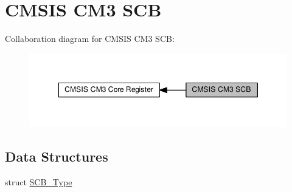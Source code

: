 \hypertarget{group__CMSIS__CM3__SCB}{}\section{C\+M\+S\+IS C\+M3 S\+CB}
\label{group__CMSIS__CM3__SCB}
Collaboration diagram for C\+M\+S\+IS C\+M3 S\+CB\+:\nopagebreak
\begin{figure}[H]
\begin{center}
\leavevmode
\includegraphics[width=350pt]{d7/dbc/group__CMSIS__CM3__SCB}
\end{center}
\end{figure}
\subsection*{Data Structures}
\begin{DoxyCompactItemize}
\item 
struct \hyperlink{structSCB__Type}{S\+C\+B\+\_\+\+Type}
\end{DoxyCompactItemize}
